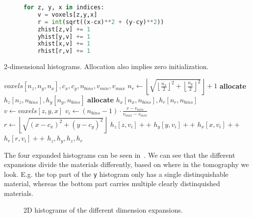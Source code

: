 
\begin{figure}
    \begin{lstlisting}[language=Python,caption=Python-like pseudo code for computing 2D histograms.,label=lis:2dhists]
for z, y, x in indices:
    v = voxels[z,y,x]
    r = int(sqrt((x-cx)**2 + (y-cy)**2))
    zhist[z,v] += 1
    yhist[y,v] += 1
    xhist[x,v] += 1
    rhist[r,v] += 1
    \end{lstlisting}
\end{figure}

\begin{algorithm}
    \caption{2-dimensional histograms. Allocation also implies zero initialization.}
    \label{alg:2dhists}
    \begin{algorithmic}
         {$voxels[n_z,n_y,n_x],c_x,c_y,n_{bins},v_{min},v_{max}$}
            \State $n_r \gets \left\lfloor\sqrt{\left\lfloor \frac{n_x}{2} \right\rfloor^2 + \left\lfloor \frac{n_y}{2} \right\rfloor^2}\right\rfloor+1$
            \State \textbf{allocate} $h_z[n_z,n_{bins}], h_y[n_y,n_{bins}]$
            \State \textbf{allocate} $h_x[n_x,n_{bins}], h_r[n_r,n_{bins}]$
                \State $v \gets voxels[z,y,x]$
                    \State $v_{i} \gets (n_{bins}-1) \cdot \frac{v - v_{min}}{v_{max} - v_{min}}$
                    \State $r \gets \left\lfloor\sqrt{(x-c_x)^2 + (y-c_y)^2}\right\rfloor$
                    \State $h_z[z,v_{i}]{+}{+}$
                    \State $h_y[y,v_{i}]{+}{+}$
                    \State $h_x[x,v_{i}]{+}{+}$
                    \State $h_r[r,v_{i}]{+}{+}$
                \EndIf
            \EndFor
            \Return $h_z,h_y,h_z,h_r$
        \EndFunction
    \end{algorithmic}
\end{algorithm}

The four expanded histograms can be seen in~.
We can see that the different expansions divide the materials differently, based on where in the tomography we look.
E.g. the top part of the \texttt{y} histogram only has a single distinquishable material, whereas the bottom part carries multiple clearly distinquished materials.

\begin{figure}
    \centering
    \caption{2D histograms of the different dimension expansions.}
    \label{fig:2dhists}
\end{figure}

